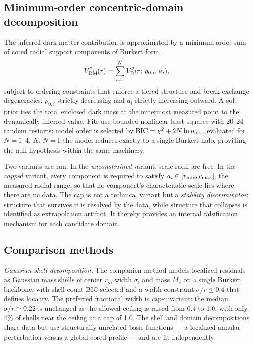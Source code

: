 \documentclass[twocolumn]{aastex701}
\begin{document}
\subsection{Minimum-order concentric-domain decomposition}
\label{sec:tiers}

The inferred dark-matter contribution is approximated by a minimum-order sum
of cored radial support components of Burkert form,
\begin{equation}
V^2_{\rm DM}(r) = \sum_{i=1}^{N} V^2_{\rm B}(r;\,\rho_{0,i},\,a_i),
\end{equation}
subject to ordering constraints that enforce a tiered structure and break
exchange degeneracies: $\rho_{0,i}$ strictly decreasing and $a_i$ strictly
increasing outward. A soft prior ties the total enclosed dark mass at the
outermost measured point to the dynamically inferred value. Fits use bounded
nonlinear least squares with 20--24 random restarts; model order is selected
by ${\rm BIC} = \chi^2 + 2N \ln n_{\rm pts}$, evaluated for $N = 1$--$4$.
At $N = 1$ the model reduces exactly to a single Burkert halo, providing the
null hypothesis within the same machinery.

Two variants are run. In the \emph{unconstrained} variant, scale radii are
free. In the \emph{capped} variant, every component is required to satisfy
$a_i \in [r_{\rm min}, r_{\rm max}]$, the measured radial range, so that no
component's characteristic scale lies where there are no data. The cap is not
a technical variant but a \emph{stability discriminator}: structure that
survives it is resolved by the data, while structure that collapses is
identified as extrapolation artifact. It thereby provides an internal
falsification mechanism for each candidate domain.

\subsection{Comparison methods}

\emph{Gaussian-shell decomposition.} The companion method models localized
residuals as Gaussian mass shells of center $r_s$, width $\sigma$, and mass
$M_s$ on a single Burkert backbone, with shell count BIC-selected and a width
constraint $\sigma/r \le 0.4$ that defines locality. The preferred fractional
width is cap-invariant: the median $\sigma/r \simeq 0.22$ is unchanged as the
allowed ceiling is raised from 0.4 to 1.0, with only 4\% of shells near the
ceiling at a cap of 1.0. The shell and domain decompositions share data but
use structurally unrelated basis functions --- a localized annular perturbation
versus a global cored profile --- and are fit independently.
\end{document}
